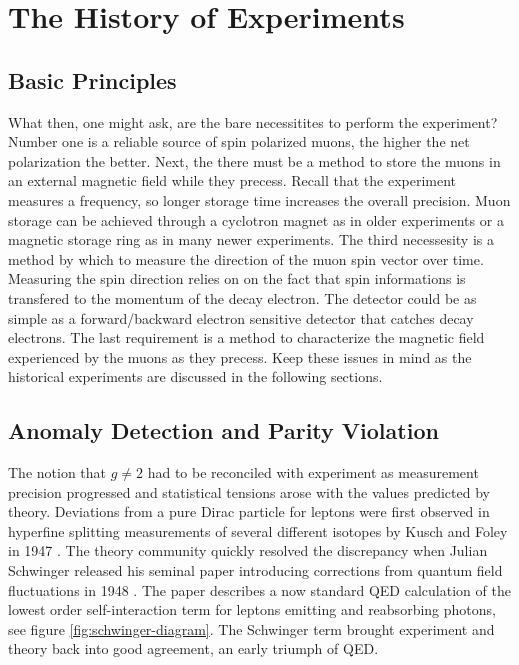 \section{The History of Experiments} \label{sec:history-expt}

\subsection{Basic Principles}
What then, one might ask, are the bare necessitites to perform the \gmtwo experiment?  Number one is a reliable source of spin polarized muons, the higher the net polarization the better.  Next, the there must be a method to store the muons in an external magnetic field while they precess.  Recall that the experiment measures a frequency, so longer storage time increases the overall precision. Muon storage can be achieved through a cyclotron magnet as in older experiments or a magnetic storage ring as in many newer experiments.  The third necessesity is a method by which to measure the direction of the muon spin vector over time.  Measuring the spin direction relies on on the fact that spin informations is transfered to the momentum of the decay electron.  The detector could be as simple as a forward/backward electron sensitive detector that catches decay electrons.  The last requirement is a method to characterize the magnetic field experienced by the muons as they precess.  Keep these issues in mind as the historical experiments are discussed in the following sections.

\subsection{Anomaly Detection and Parity Violation}

The notion that $g \ne 2$ had to be reconciled with experiment as measurement precision progressed and statistical tensions arose with the values predicted by theory.  Deviations from a pure Dirac particle for leptons were first observed in hyperfine splitting measurements of several different isotopes by Kusch and Foley in 1947 \cite{kusch-foley}.  The theory community quickly resolved the discrepancy when Julian Schwinger released his seminal paper introducing corrections from quantum field fluctuations in 1948 \cite{schwinger}.  The paper describes a now standard QED calculation of the lowest order self-interaction term for leptons emitting and reabsorbing photons, see figure \ref{fig:schwinger-diagram}.  The Schwinger term brought experiment and theory back into good agreement, an early triumph of QED.

